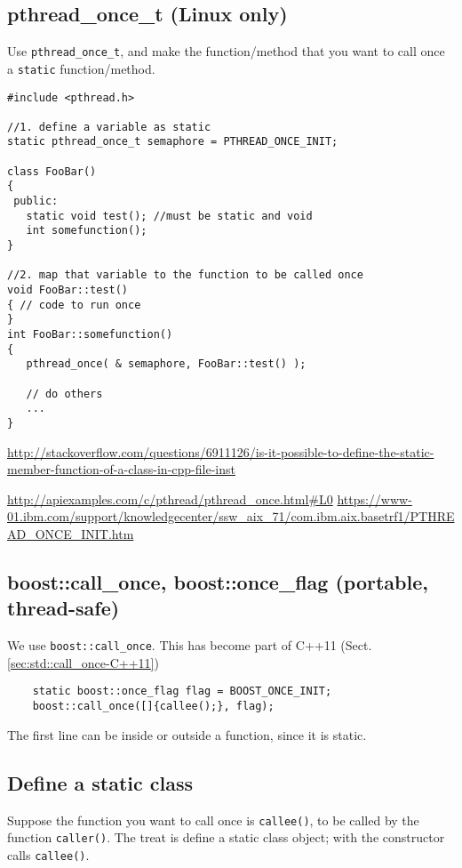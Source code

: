 \subsection{pthread\_once\_t (Linux only)}

Use \verb!pthread_once_t!, and make the function/method that you want to call
once a \verb!static! function/method.

\begin{lstlisting}
#include <pthread.h>

//1. define a variable as static 
static pthread_once_t semaphore = PTHREAD_ONCE_INIT;

class FooBar()
{
 public:
   static void test(); //must be static and void
   int somefunction();
}

//2. map that variable to the function to be called once
void FooBar::test()
{ // code to run once
}
int FooBar::somefunction()
{
   pthread_once( & semaphore, FooBar::test() );
   
   // do others
   ...
}
\end{lstlisting}
\url{http://stackoverflow.com/questions/6911126/is-it-possible-to-define-the-static-member-function-of-a-class-in-cpp-file-inst}

\url{http://apiexamples.com/c/pthread/pthread_once.html#L0}
\url{https://www-01.ibm.com/support/knowledgecenter/ssw_aix_71/com.ibm.aix.basetrf1/PTHREAD_ONCE_INIT.htm}


\subsection{boost::call\_once, boost::once\_flag (portable, thread-safe)}
\label{sec:boost::call_once}

We use \verb!boost::call_once!.
This has become part of C++11 (Sect.\ref{sec:std::call_once-C++11})


\begin{lstlisting}
    static boost::once_flag flag = BOOST_ONCE_INIT;
    boost::call_once([]{callee();}, flag);  
\end{lstlisting}
The first line can be inside or outside a function, since it is static.

\subsection{Define a static class}

Suppose the function you want to call once is \verb!callee()!, to be called by 
the function \verb!caller()!. The treat is define a static class object; with
the constructor calls \verb!callee()!.


